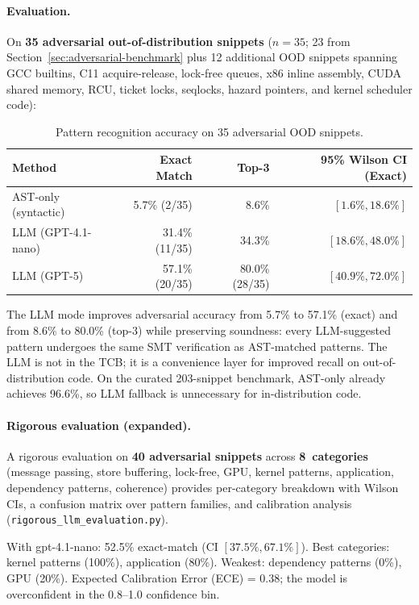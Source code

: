 \documentclass[11pt]{article}
\begin{document}
\paragraph{Evaluation.}
On \textbf{35 adversarial out-of-distribution snippets} ($n=35$;
23 from Section~\ref{sec:adversarial-benchmark} plus 12 additional
OOD snippets spanning GCC builtins, C11 acquire-release, lock-free
queues, x86 inline assembly, CUDA shared memory, RCU, ticket locks,
seqlocks, hazard pointers, and kernel scheduler code):

\begin{table}[ht]
\centering
\caption{Pattern recognition accuracy on 35 adversarial OOD snippets.}
\label{tab:llm-accuracy}
\small
\begin{tabular}{lrrr}
\toprule
\textbf{Method} & \textbf{Exact Match} & \textbf{Top-3} & \textbf{95\% Wilson CI (Exact)} \\
\midrule
AST-only (syntactic)      & 5.7\% (2/35)  & 8.6\% & $[1.6\%, 18.6\%]$ \\
LLM (GPT-4.1-nano)        & 31.4\% (11/35) & 34.3\% & $[18.6\%, 48.0\%]$ \\
LLM (GPT-5)               & 57.1\% (20/35) & 80.0\% (28/35) & $[40.9\%, 72.0\%]$ \\
\bottomrule
\end{tabular}
\end{table}

\noindent
The LLM mode improves adversarial accuracy from 5.7\% to 57.1\%
(exact) and from 8.6\% to 80.0\% (top-3)
while preserving soundness: every LLM-suggested pattern undergoes
the same SMT verification as AST-matched patterns.
The LLM is not in the TCB; it is a convenience layer for improved
recall on out-of-distribution code.
On the curated 203-snippet benchmark, AST-only already achieves
96.6\%, so LLM fallback is unnecessary for in-distribution code.

\paragraph{Rigorous evaluation (expanded).}
A rigorous evaluation on \textbf{40 adversarial snippets} across
\textbf{8~categories} (message passing, store buffering, lock-free,
GPU, kernel patterns, application, dependency patterns, coherence)
provides per-category breakdown with Wilson CIs, a confusion matrix
over pattern families, and calibration analysis
(\texttt{rigorous\_llm\_evaluation.py}).

With gpt-4.1-nano: 52.5\% exact-match (CI $[37.5\%, 67.1\%]$).
Best categories: kernel patterns (100\%), application (80\%).
Weakest: dependency patterns (0\%), GPU (20\%).
Expected Calibration Error (ECE) = 0.38; the model is overconfident
in the 0.8--1.0 confidence bin.
\end{document}
